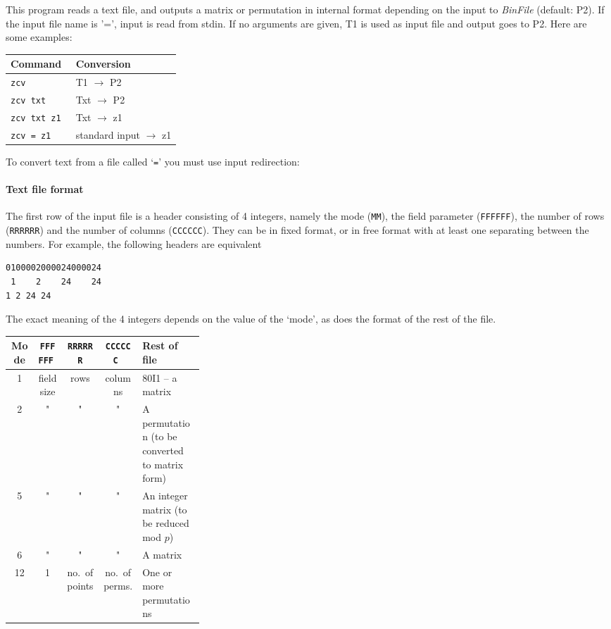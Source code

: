 \Description
This program reads a text file, and outputs a matrix or permutation
in internal format depending on the input to {\it BinFile} (default:
P2). If the input file name is '=', input is read from stdin. If no
arguments are given, T1 is used as input file and output goes to P2.
Here are some examples:
\begin{center}
\begin{tabular}{|l|l|}
\hline
Command         & Conversion \\
\hline
\tt zcv		& T1    $\rightarrow$ P2 \\
\tt zcv txt	& Txt   $\rightarrow$ P2 \\
\tt zcv txt z1	& Txt   $\rightarrow$ z1 \\
\tt zcv = z1	& standard input $\rightarrow$ z1 \\
\hline
\end{tabular}
\end{center}
To convert text from a file called `{\tt =}' you must use input
redirection:

\paragraph{Text file format}
The first row of the input file is a header consisting of 4 integers,
namely the mode
({\tt MM}), the field parameter ({\tt FFFFFF}), the number of rows
({\tt RRRRRR}) and the number of columns ({\tt CCCCCC}). They can
be in fixed format,
or in free format with at least one separating between the numbers.
For example, the following headers are equivalent
\begin{verbatim}
0100002000024000024
 1    2    24    24
1 2 24 24
\end{verbatim}
The exact meaning of the 4 integers depends on the value of the `mode',
as does the format of the rest of the file.
\begin{center}
\small
\begin{tabular}{|c|c|c|c|p{0.32\linewidth}|}
\hline
Mode  &\tt FFFFFF &\tt RRRRRR&\tt CCCCCC & Rest of file \\
\hline
 1 & field size   &    rows  &  columns  & 80I1 -- a matrix \\
 2 &     "        &     "    &   "       & A permutation (to be
	converted to matrix form)\\
 5 &     "        &     "    &   "       & An integer matrix (to
	be reduced mod $p$) \\
 6 &     "        &     "    &   "       & A matrix \\
12 &     1    &  no.\ of points & no.\ of perms.&
	One or more permutations\\
\hline
\end{tabular}
\end{center}

